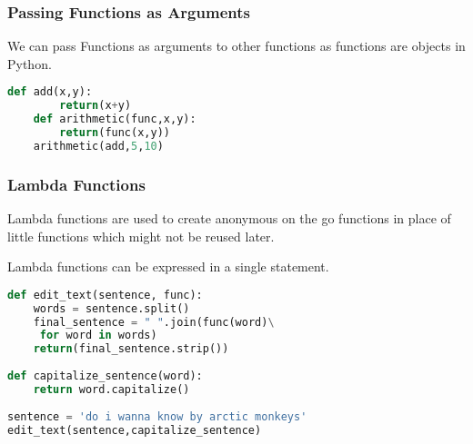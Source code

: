 \documentclass{beamer}
\begin{document}
\begin{frame}[fragile]
\frametitle{Passing Functions as Arguments}
We can pass Functions as arguments to other functions as functions are objects in Python.
\begin{lstlisting}[language=Python]
	def add(x,y):
		return(x+y)
	def arithmetic(func,x,y):
		return(func(x,y))
	arithmetic(add,5,10)
\end{lstlisting}
\end{frame}

\begin{frame}[fragile]
\frametitle{Lambda Functions}
Lambda functions are used to create anonymous on the go functions in place of little functions which might not be reused later.

Lambda functions can be expressed in a single statement.
\begin{lstlisting}[language=Python]
def edit_text(sentence, func):
    words = sentence.split()
    final_sentence = " ".join(func(word)\
     for word in words)
    return(final_sentence.strip())
    
def capitalize_sentence(word):
    return word.capitalize()
    
sentence = 'do i wanna know by arctic monkeys'
edit_text(sentence,capitalize_sentence)
\end{lstlisting}
\end{frame}
\end{document}
